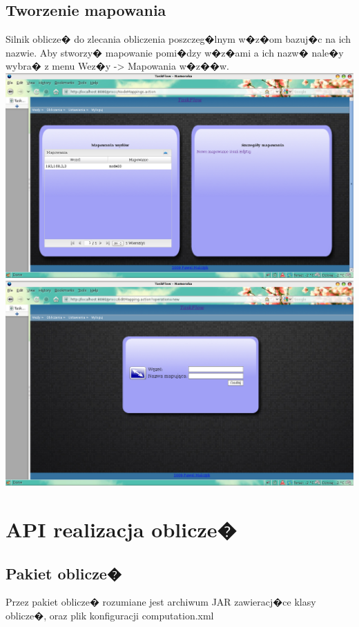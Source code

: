 \documentclass{article}
\begin{document}
\subsection{Tworzenie mapowania}
Silnik oblicze� do zlecania obliczenia poszczeg�lnym w�z�om bazuj�c na ich nazwie. Aby stworzy� mapowanie pomi�dzy w�z�ami a ich nazw� nale�y 
wybra� z menu Wez�y -> Mapowania w�z��w.
\newline \newline
\includegraphics[scale=0.4]{img/mapping01.png}
\newline \newline
\includegraphics[scale=0.4]{img/mapping00.png}


\section{API realizacja oblicze�}
\subsection{Pakiet oblicze�}
Przez pakiet oblicze� rozumiane jest archiwum JAR zawieracj�ce klasy oblicze�, oraz plik konfiguracji computation.xml
\end{document}
